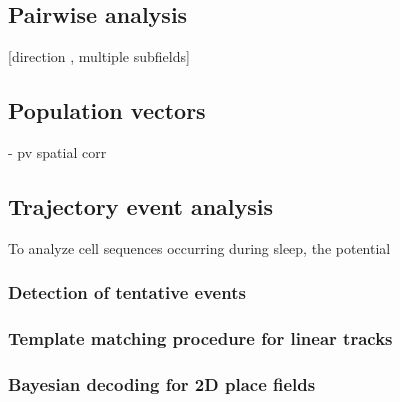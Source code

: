 \subsection{Pairwise analysis}

[direction , multiple subfields]

\subsection{Population vectors}
\cite{Gothard1996} - pv spatial corr 

\subsection{Trajectory event analysis}
To analyze cell sequences occurring during sleep, the potential 
\subsubsection{Detection of tentative events}

\subsubsection{Template matching procedure for linear tracks}

\subsubsection{Bayesian decoding for 2D place fields}

	
